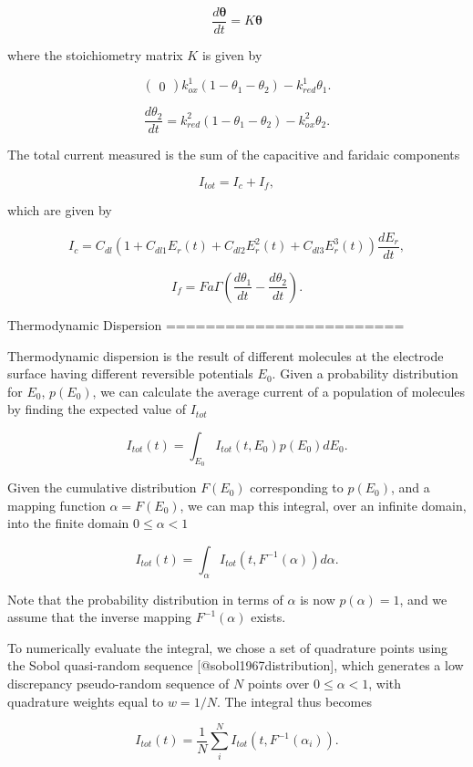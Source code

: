 \documentclass[a4paper, 12pt]{article}
\begin{document}
$$
\frac{d\mathbf{\theta}}{dt} = K \mathbf{\theta}
$$

where the stoichiometry matrix $K$ is given by

$$
\begin{pmatrix}
0
\end{pmatrix}


k^1_{ox}(1-\theta_1-\theta_2) - k^1_{red}\theta_1.
$$

$$
\frac{d\theta_2}{dt} = k^2_{red}(1-\theta_1-\theta_2) - k^2_{ox}\theta_2.
$$


The total current measured is the sum of the capacitive and faridaic components

$$
I_{tot} = I_c + I_f,
$$

which are given by

$$
I_c = C_{dl} \left(1 + C_{dl1} E_r(t) + C_{dl2} E_r^2(t) + C_{dl3} 
E_r^3(t)\right) \frac{dE_r}{dt},
$$

$$
I_f = F a \Gamma \left( \frac{d\theta_1}{dt} - \frac{d\theta_2}{dt} \right).
$$

Thermodynamic Dispersion
========================

Thermodynamic dispersion is the result of different molecules at the electrode 
surface having different reversible potentials $E_0$. Given a probability 
distribution for $E_0$, $p(E_0)$, we can calculate the average current of a 
population of molecules by finding the expected value of $I_{tot}$

$$
I_{tot}(t) = \int_{E_0} I_{tot}(t,E_0)p(E_0) dE_0.
$$

Given the cumulative distribution $F(E_0)$ corresponding to $p(E_0)$, and a 
mapping function $\alpha = F(E_0)$, we can map this integral, over an infinite 
domain, into the finite domain $0 \le \alpha < 1$ 

$$
I_{tot}(t) = \int_{\alpha} I_{tot}(t,F^{-1}(\alpha)) d\alpha.
$$

Note that the probability distribution in terms of $\alpha$ is now $p(\alpha) = 
1$, and we assume that the inverse mapping $F^{-1}(\alpha)$ exists.

To numerically evaluate the integral, we chose a set of quadrature points using 
the Sobol quasi-random sequence [@sobol1967distribution], which generates a low 
discrepancy pseudo-random sequence of $N$ points over $0 \le \alpha < 1$, with 
quadrature weights equal to $w=1/N$. The integral thus becomes

$$
I_{tot}(t) = \frac{1}{N} \sum_i^N I_{tot}(t,F^{-1}(\alpha_i)).
$$
\end{document}
